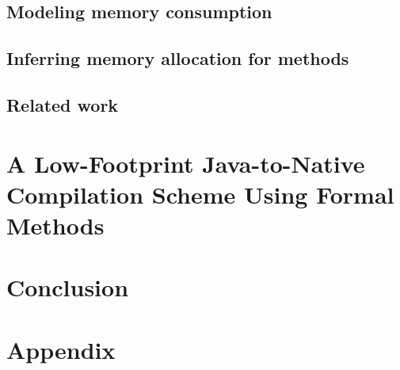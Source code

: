 \documentclass[book,10pt]{book}
\begin{document}
  \section{Modeling memory consumption}\label{sec:verif}
    
  
  
  
  \section{Inferring memory allocation for methods}\label{sec:infer}
  \label{sec:infer}
  \section{Related work}\label{sec:rel}
  

\chapter{A Low-Footprint Java-to-Native Compilation Scheme Using Formal Methods}\label{applications:optimComp}
  \lstset{frameround=tttt}
  
  
  
  
  
  
   
   
  
 

\chapter{Conclusion}


\appendix
\chapter{Appendix}
    
    
    

 
 


\end{document}
